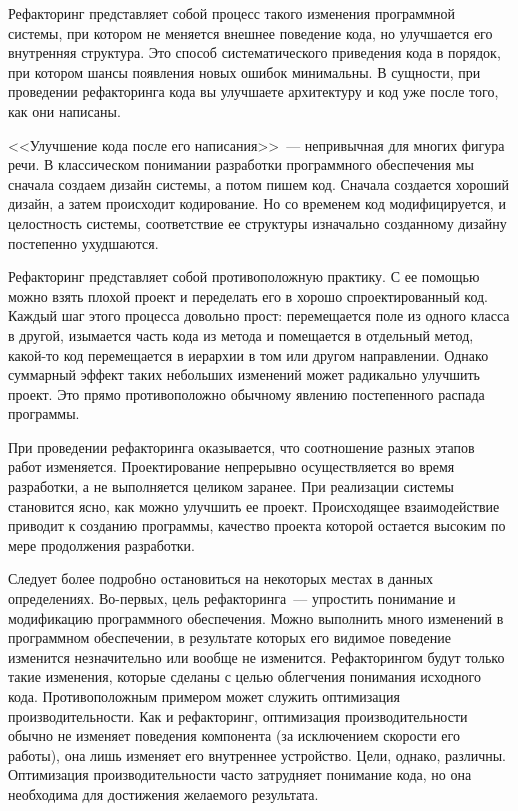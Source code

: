 \documentclass{../../text-style}
\begin{document}
\maketitle
\thispagestyle{empty}


Рефакторинг представляет собой процесс такого изменения программной системы, при котором не меняется внешнее поведение кода, но улучшается его внутренняя структура. Это способ систематического приведения кода в порядок, при котором шансы появления новых ошибок минимальны. В сущности, при проведении рефакторинга кода вы улучшаете архитектуру и код уже после того, как они написаны.

<<Улучшение кода после его написания>>~--- непривычная для многих фигура речи. В классическом понимании разработки программного обеспечения мы сначала создаем дизайн системы, а потом пишем код. Сначала создается хороший дизайн, а затем происходит кодирование. Но со временем код модифицируется, и целостность системы, соответствие ее структуры изначально созданному дизайну постепенно ухудшаются.

Рефакторинг представляет собой противоположную практику. С ее помощью можно взять плохой проект и переделать его в хорошо спроектированный код. Каждый шаг этого процесса довольно прост: перемещается поле из одного класса в другой, изымается часть кода из метода и помещается в отдельный метод, какой-то код перемещается в иерархии в том или другом направлении. Однако суммарный эффект таких небольших изменений может радикально улучшить проект. Это прямо противоположно обычному явлению постепенного распада программы.

При проведении рефакторинга оказывается, что соотношение разных этапов работ изменяется. Проектирование непрерывно осуществляется во время разработки, а не выполняется целиком заранее. При реализации системы становится ясно, как можно улучшить ее проект. Происходящее взаимодействие приводит к созданию программы, качество проекта которой остается высоким по мере продолжения разработки.

Следует более подробно остановиться на некоторых местах в данных определениях. Во-первых, цель рефакторинга~--- упростить понимание и модификацию программного обеспечения. Можно выполнить много изменений в программном обеспечении, в результате которых его видимое поведение изменится незначительно или вообще не изменится. Рефакторингом будут только такие изменения, которые сделаны с целью облегчения понимания исходного кода. Противоположным примером может служить оптимизация производительности. Как и рефакторинг, оптимизация производительности обычно не изменяет поведения компонента (за исключением скорости его работы), она лишь изменяет его внутреннее устройство. Цели, однако, различны. Оптимизация производительности часто затрудняет понимание кода, но она необходима для достижения желаемого результата.
\end{document}
